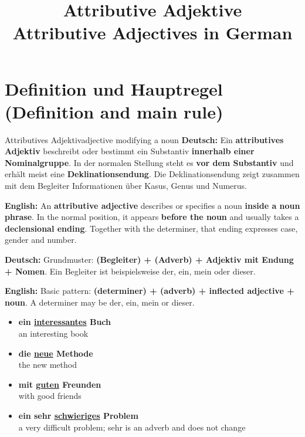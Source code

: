 \documentclass[a4paper,11pt]{article}
\title{Attributive Adjektive\\\large Attributive Adjectives in German}
\date{}
\newcommand{\GermanText}[1]{\textbf{Deutsch: }#1\par}
\newcommand{\EnglishText}[1]{{\small\color{SoftGray}\textbf{English: }#1\par}}
\newcommand{\ExampleItem}[2]{\item \textbf{#1}\\{\small\color{SoftGray}#2}}
\begin{document}
\maketitle
\tableofcontents
\newpage

\section{Definition und Hauptregel \textnormal{(Definition and main rule)}}
\begin{grammarentry}{Attributives Adjektiv}{adjective modifying a noun}
\GermanText{Ein \textbf{attributives Adjektiv} beschreibt oder bestimmt ein Substantiv \textbf{innerhalb einer Nominalgruppe}. In der normalen Stellung steht es \textbf{vor dem Substantiv} und erhält meist eine \textbf{Deklinationsendung}. Die Deklinationsendung zeigt zusammen mit dem Begleiter Informationen über Kasus, Genus und Numerus.}
\EnglishText{An \textbf{attributive adjective} describes or specifies a noun \textbf{inside a noun phrase}. In the normal position, it appears \textbf{before the noun} and usually takes a \textbf{declensional ending}. Together with the determiner, that ending expresses case, gender and number.}
\GermanText{Grundmuster: \textbf{(Begleiter) + (Adverb) + Adjektiv mit Endung + Nomen}. Ein Begleiter ist beispielsweise der, ein, mein oder dieser.}
\EnglishText{Basic pattern: \textbf{(determiner) + (adverb) + inflected adjective + noun}. A determiner may be der, ein, mein or dieser.}
\end{grammarentry}
\begin{exbox}\begin{itemize}
\ExampleItem{ein \underline{interessantes} Buch}{an interesting book}
\ExampleItem{die \underline{neue} Methode}{the new method}
\ExampleItem{mit \underline{guten} Freunden}{with good friends}
\ExampleItem{ein sehr \underline{schwieriges} Problem}{a very difficult problem; sehr is an adverb and does not change}
\end{itemize}\end{exbox}
\end{document}
